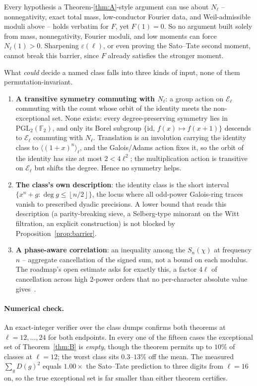 \documentclass[10pt]{article}
\theoremstyle{plain}
\newcommand{\F}{\mathbb F}
\newcommand{\E}{\mathcal E}
\newcommand{\flr}[1]{\left\lfloor #1\right\rfloor}
\begin{document}
Every hypothesis a Theorem-\ref{thm:A}-style argument can use about $N_\ell$
-- nonnegativity, exact total mass, low-conductor Fourier data, and
Weil-admissible moduli above -- holds verbatim for $F$, yet $F(1)=0$. So no
argument built solely from mass, nonnegativity, Fourier moduli, and low
moments can force $N_\ell(1)>0$. Sharpening $\varepsilon(\ell)$, or even
proving the Sato--Tate second moment, cannot break this barrier, since $F$
already satisfies the stronger moment.

What \emph{could} decide a named class falls into three kinds of input, none
of them permutation-invariant.
\begin{enumerate}[label=(\arabic*)]
\item \textbf{A transitive symmetry commuting with $N_\ell$}: a group action on
  $\E_\ell$ commuting with the count whose orbit of the identity meets the
  non-exceptional set. None exists: every degree-preserving symmetry lies in
  $\mathrm{PGL}_2(\F_2)$, and only its Borel subgroup
  $\{\mathrm{id},\,f(x)\mapsto f(x+1)\}$ descends to $\E_\ell$ commuting with
  $N_\ell$. Translation is an involution carrying the identity class to
  $\langle(1+x)^n\rangle_\ell$, and the Galois/Adams action fixes it, so the
  orbit of the identity has size at most $2<4\ell^2$; the multiplication action
  is transitive on $\E_\ell$ but shifts the degree. Hence no symmetry helps.
\item \textbf{The class's own description}: the identity class is the short
  interval $\{x^n+g:\deg g\le\flr{n/2}\}$, the locus where all odd-power
  Galois-ring traces vanish to prescribed dyadic precisions. A lower bound that
  reads this description (a parity-breaking sieve, a Selberg-type minorant on
  the Witt filtration, an explicit construction) is not blocked by
  Proposition~\ref{prop:barrier}.
\item \textbf{A phase-aware correlation}: an inequality among the $S_n(\chi)$
  at frequency $n$ -- aggregate cancellation of the signed sum, not a bound on
  each modulus. The roadmap's open estimate asks for exactly this, a factor
  $4\ell$ of cancellation across high $2$-power orders that no per-character
  absolute value gives~\cite{roadmap}.
\end{enumerate}

\paragraph{Numerical check.}
An exact-integer verifier over the class dumps confirms both theorems at
$\ell=12,\dots,24$ for both endpoints. In every one of the fifteen cases the
exceptional set of Theorem~\ref{thm:B} is \emph{empty}, though the theorem
permits up to $10\%$ of classes at $\ell=12$; the worst class sits
$0.3$--$13\%$ off the mean. The measured $\sum_g D(g)^2$ equals $1.00\times$
the Sato--Tate prediction to three digits from $\ell=16$ on, so the true
exceptional set is far smaller than either theorem certifies.
\end{document}
